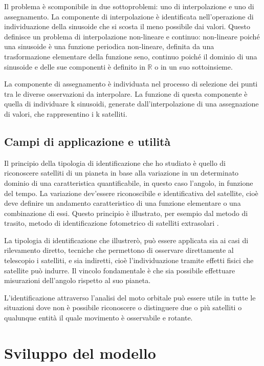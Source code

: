 \documentclass[a4paper,12pt]{report}
\begin{document}
Il problema è scomponibile in due sottoproblemi: uno di interpolazione e uno di assegnamento. La componente di interpolazione è identificata nell'operazione di individuazione della sinusoide che si scosta il meno possibile dai valori. Questo definisce un problema di interpolazione non-lineare e continuo: non-lineare poiché una sinusoide è una funzione periodica non-lineare, definita da una trasformazione elementare della funzione seno, continuo poiché il dominio di una sinusoide e delle sue componenti è definito in $\mathbb{R}$ o in un suo sottoinsieme.

La componente di assegnamento è individuata nel processo di selezione dei punti tra le diverse osservazioni da interpolare.
La funzione di questa componente è quella di individuare k sinusoidi, generate dall'interpolazione di una assegnazione di valori, che rappresentino i k satelliti.



\section{Campi di applicazione e utilità}
Il principio della tipologia di identificazione che ho studiato è quello di riconoscere satelliti di un pianeta in base alla variazione in un determinato dominio di una caratteristica quantificabile, in questo caso l'angolo, in funzione del tempo. La variazione dev'essere riconoscibile e identificativa del satellite, cioè deve definire un andamento caratteristico di una funzione elementare o una combinazione di essi. Questo principio è illustrato, per esempio dal metodo di trasito, metodo di identificazione fotometrico di satelliti extrasolari \cite{transito}.

La tipologia di identificazione che illustrerò, può essere applicata sia ai casi di rilevamento diretto, tecniche che permettono di osservare direttamente al telescopio i satelliti, e sia indiretti, cioè l'individuazione tramite effetti fisici che satellite può indurre. Il vincolo fondamentale è che sia possibile effettuare misurazioni dell'angolo rispetto al suo pianeta.

L'identificazione attraverso l'analisi del moto orbitale può essere utile in tutte le situazioni dove non è possibile riconoscere o distinguere due o più satelliti o qualunque entità il quale movimento è osservabile e rotante.





%
%
\chapter{Sviluppo del modello}
\end{document}
